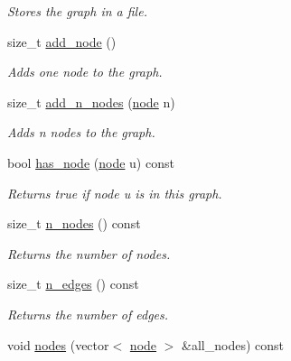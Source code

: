 \begin{DoxyCompactItemize}
\begin{DoxyCompactList}\small\item\em Stores the graph in a file. \end{DoxyCompactList}\item 
size\+\_\+t \hyperlink{classlgraph_1_1utils_1_1xxgraph_af41baf2c098e872731ad646aeec1b382}{add\+\_\+node} ()
\begin{DoxyCompactList}\small\item\em Adds one node to the graph. \end{DoxyCompactList}\item 
size\+\_\+t \hyperlink{classlgraph_1_1utils_1_1xxgraph_af4f3782c1a55f73c6f34f2f2c26fb404}{add\+\_\+n\+\_\+nodes} (\hyperlink{namespacelgraph_1_1utils_a7bd66ede3805ef121bc2835bd48de0cf}{node} n)
\begin{DoxyCompactList}\small\item\em Adds {\itshape n} nodes to the graph. \end{DoxyCompactList}\item 
bool \hyperlink{classlgraph_1_1utils_1_1xxgraph_a026ab064c2be26790cc1f547be2157c9}{has\+\_\+node} (\hyperlink{namespacelgraph_1_1utils_a7bd66ede3805ef121bc2835bd48de0cf}{node} u) const \hypertarget{classlgraph_1_1utils_1_1xxgraph_a026ab064c2be26790cc1f547be2157c9}{}\label{classlgraph_1_1utils_1_1xxgraph_a026ab064c2be26790cc1f547be2157c9}

\begin{DoxyCompactList}\small\item\em Returns true if node {\itshape u} is in this graph. \end{DoxyCompactList}\item 
size\+\_\+t \hyperlink{classlgraph_1_1utils_1_1xxgraph_ad345f1fbf1dee34e1579b5aea9aef9b2}{n\+\_\+nodes} () const 
\begin{DoxyCompactList}\small\item\em Returns the number of nodes. \end{DoxyCompactList}\item 
size\+\_\+t \hyperlink{classlgraph_1_1utils_1_1xxgraph_af3f7c3835406c2cbf70479ae1c0253c9}{n\+\_\+edges} () const 
\begin{DoxyCompactList}\small\item\em Returns the number of edges. \end{DoxyCompactList}\item 
void \hyperlink{classlgraph_1_1utils_1_1xxgraph_a99f83387aa9f59b861e675251be5a3ad}{nodes} (vector$<$ \hyperlink{namespacelgraph_1_1utils_a7bd66ede3805ef121bc2835bd48de0cf}{node} $>$ \&all\+\_\+nodes) const \hypertarget{classlgraph_1_1utils_1_1xxgraph_a99f83387aa9f59b861e675251be5a3ad}{}\label{classlgraph_1_1utils_1_1xxgraph_a99f83387aa9f59b861e675251be5a3ad}


\end{DoxyCompactItemize}
